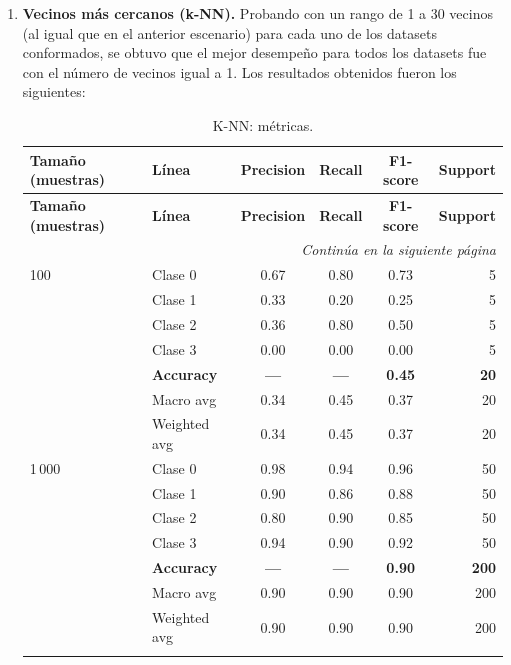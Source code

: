 \documentclass[12pt,a4paper]{article}
\begin{document}
\begin{enumerate}
  \item \textbf{Vecinos más cercanos (k-NN).}
  Probando con un rango de 1 a 30 vecinos (al igual que en el anterior escenario) para cada uno de los datasets conformados, se obtuvo que el mejor 
  desempeño para todos los datasets fue con el número de vecinos igual a 1. Los resultados obtenidos fueron los siguientes:
  
  \small
  \setlength{\tabcolsep}{4pt}
  \begin{longtable}{@{}l l c c c r@{}}
    \toprule
    \textbf{Tamaño (muestras)} & \textbf{Línea} & \textbf{Precision} & \textbf{Recall} & \textbf{F1-score} & \textbf{Support} \\
    \midrule
    \endfirsthead

    \toprule
    \textbf{Tamaño (muestras)} & \textbf{Línea} & \textbf{Precision} & \textbf{Recall} & \textbf{F1-score} & \textbf{Support} \\
    \midrule
    \endhead

    \midrule
    \multicolumn{6}{r}{\emph{Continúa en la siguiente página}} \\
    \endfoot

    \bottomrule
    \caption{K-NN: métricas.}
    \label{tab:reportes_clasificacion_knn_sc2}
    \endlastfoot

    100   & Clase 0       & 0.67 & 0.80 & 0.73 & 5 \\
          & Clase 1       & 0.33 & 0.20 & 0.25 & 5 \\
          & Clase 2       & 0.36 & 0.80 & 0.50 & 5 \\
          & Clase 3       & 0.00 & 0.00 & 0.00 & 5 \\
          & \textbf{Accuracy}    & \textbf{—}   & \textbf{—}   & \textbf{0.45} & \textbf{20} \\
          & Macro avg     & 0.34 & 0.45 & 0.37 & 20 \\
          & Weighted avg  & 0.34 & 0.45 & 0.37 & 20 \\
    \addlinespace

    1\,000 & Clase 0      & 0.98 & 0.94 & 0.96 & 50 \\
          & Clase 1       & 0.90 & 0.86 & 0.88 & 50 \\
          & Clase 2       & 0.80 & 0.90 & 0.85 & 50 \\
          & Clase 3       & 0.94 & 0.90 & 0.92 & 50 \\
          & \textbf{Accuracy}    & \textbf{—}   & \textbf{—}   & \textbf{0.90} & \textbf{200} \\
          & Macro avg     & 0.90 & 0.90 & 0.90 & 200 \\
          & Weighted avg  & 0.90 & 0.90 & 0.90 & 200 \\
    \addlinespace


\end{longtable}
\end{enumerate}
\end{document}
